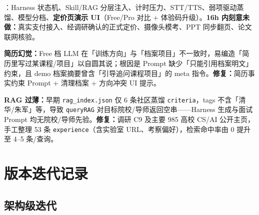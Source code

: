 \documentclass[11pt, a4paper]{article}
\begin{document}
\begin{center}
\end{center}

：Harness 状态机、Skill/RAG 分层注入、计时压力、STT/TTS、弱项驱动蒸馏、模型分档、\textbf{定价页演示 UI}（Free/Pro 对比 + 体验码升级）。\textbf{16h 内刻意未做：}真实支付接入、经调研确认的正式定价、摄像头模考、PPT 同步翻页、论文联网核验。

\begin{keypoint}
\textbf{简历幻觉：}Free 档 LLM 在「训练方向」与「档案项目」不一致时，易编造「简历里写过某课程/项目」以自圆其说；根因是 Prompt 缺少「只能引用档案明文」约束，且 demo 档案摘要曾含「引导追问课程项目」的 meta 指令。\textbf{修复：}简历事实约束 Prompt + 清理档案 + 方向冲突 UI 提示。

\textbf{RAG 过薄：}早期 \texttt{rag\_index.json} 仅 6 条社区蒸馏 \texttt{criteria}，tags 不含「清华/朱军」等，导致 \texttt{queryRAG} 对目标院校/导师返回空串——Harness 生成与面试 Prompt 均无院校/导师先验。\textbf{修复：}调研 C9 及主要 985 高校 CS/AI 公开主页，手工整理 53 条 \texttt{experience}（含实验室 URL、考察偏好），检索命中率由 0 提升至 4--5 条/查询。
\end{keypoint}

\section{版本迭代记录}

\subsection{架构级迭代}
\end{document}
